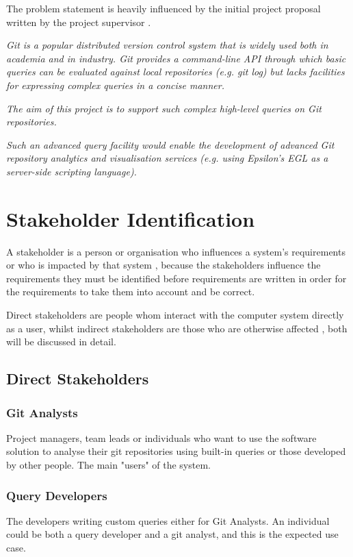 \documentclass[11pt]{book}
\begin{document}
The problem statement is heavily influenced by the initial project proposal written by the project supervisor \cite{initialproposal}.

\textit{
Git is a popular distributed version control system 	that is widely used both in academia and in industry. Git provides a command-line API through which basic queries can be evaluated against local repositories (e.g. git log) but lacks facilities for expressing complex queries in a concise manner.}

\textit{
The aim of this project is to support such complex high-level queries on Git repositories.}

\textit{
Such an advanced query facility would enable the development of advanced Git repository analytics and visualisation services (e.g. using Epsilon's EGL as a server-side scripting language).}

\section{Stakeholder Identification}
\label{stakeholders}
A stakeholder is a person or organisation who influences a system’s requirements or who is impacted by that system \cite{stakeholders}, because the stakeholders influence the requirements they must be identified before requirements are written in order for the requirements to take them into account and be correct.

Direct stakeholders are people whom interact with the computer system directly as a user, whilst indirect stakeholders are those who are otherwise affected \cite{directvsindirectstakeholders}, both will be discussed in detail.

\subsection{Direct Stakeholders}
\label{directstakeholders}
\subsubsection{Git Analysts}
Project managers, team leads or individuals who want to use the software solution to analyse their git repositories using built-in queries or those developed by other people. The main "users" of the system.

\subsubsection{Query Developers}
The developers writing custom queries either for Git Analysts. An individual could be both a query developer and a git analyst, and this is the expected use case. 
\end{document}
